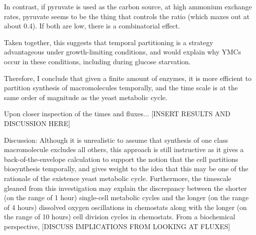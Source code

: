 In contrast, if pyruvate is used as the carbon source, at high ammonium exchange rates, pyruvate seems to be the thing that controls the ratio (which maxes out at about 0.4).
If both are low, there is a combinatorial effect.

Taken together, this suggests that temporal partitioning is a strategy advantageous under growth-limiting conditions, and would explain why YMCs occur in these conditions, including during glucose starvation.


Therefore, I conclude that given a finite amount of enzymes, it is more efficient to partition synthesis of macromolecules temporally, and the time scale is at the same order of magnitude as the yeast metabolic cycle.

Upon closer inspection of the times and fluxes... [INSERT RESULTS AND DISCUSSION HERE]

Discussion: Although it is unrealistic to assume that synthesis of one class macromolecule excludes all others, this approach is still instructive as it gives a back-of-the-envelope calculation to support the notion that the cell partitions biosynthesis temporally, and gives weight to the idea that this may be one of the rationale of the existence yeast metabolic cycle.
Furthermore, the timescale gleaned from this investigation may explain the discrepancy between the shorter (on the range of 1 hour) single-cell metabolic cycles and the longer (on the range of 4 hours) dissolved oxygen oscillations in chemostats along with the longer (on the range of 10 hours) cell division cycles in chemostats.
From a biochemical perspective, [DISCUSS IMPLICATIONS FROM LOOKING AT FLUXES]




